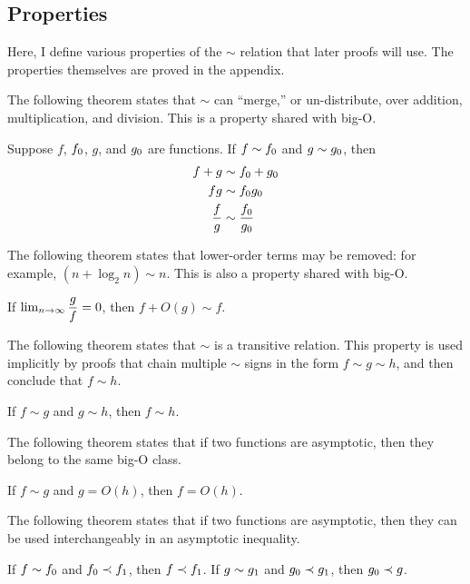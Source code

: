 \subsection{Properties}
\label{subsec:AsymptoticProperties}

Here, I define various properties of the $\sim$ relation that later proofs will use. The properties themselves are proved in the appendix.

The following theorem states that $\sim$ can ``merge,'' or un-distribute, over addition, multiplication, and division. This is a property shared with big-O.

\begin{theorem}
\label{thm:MergesOverOps}
	Suppose $f$, $f_0$, $g$, and $g_0$ are functions. If $f \sim f_0$ and $g \sim g_0$, then
	\begin{align*}
	f + g &\sim f_0 + g_0\\
	fg &\sim f_0g_0\\
	\frac{f}{g} &\sim \frac {f_0} {g_0}
	\end{align*}
\end{theorem}

The following theorem states that lower-order terms may be removed: for example, $(n + \log_2 n) \sim n$. This is also a property shared with big-O.

\begin{theorem}
\label{thm:RemovesLowerOrderTerms}
	If $\lim_{n \to \infty} \dfrac{g}{f} = 0$, then $f + O(g) \sim f$.
\end{theorem}

The following theorem states that $\sim$ is a transitive relation. This property is used implicitly by proofs that chain multiple $\sim$ signs in the form $f \sim g \sim h$, and then conclude that $f \sim h$.

\begin{theorem}
\label{thm:SimIsTransitive}
	If $f \sim g$ and $g \sim h$, then $f \sim h$.
\end{theorem}

The following theorem states that if two functions are asymptotic, then they belong to the same big-O class.

\begin{theorem}
\label{thm:SameBigOClass}
	If $f \sim g$ and $g = O(h)$, then $f = O(h)$.
\end{theorem}

The following theorem states that if two functions are asymptotic, then they can be used interchangeably in an asymptotic inequality.

\begin{theorem}
\label{thm:InterchangeableInInequality}
	If $f \sim f_0$ and $f_0 \prec f_1$, then $f \prec f_1$. If $g \sim g_1$ and $g_0 \prec g_1$, then $g_0 \prec g$.
\end{theorem}